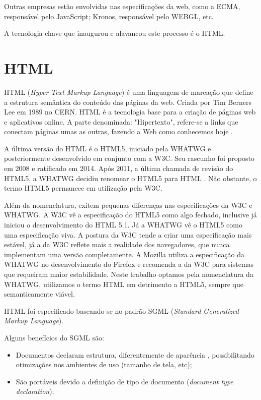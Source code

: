 Outras empresas estão envolvidas nas especificações da web, como a
ECMA, responsável pelo JavaScript; Kronos, responsável pelo WEBGL,
etc.

A tecnologia chave que inaugurou e alavancou este processo é o HTML.
\section{HTML}

HTML (\textit{Hyper Text Markup Language}) é uma linguagem de
marcação que define a estrutura semântica do conteúdo das páginas
da web. Criada por Tim Berners Lee em 1989 no CERN. HTML é a tecnologia
base para a criação de páginas web e aplicativos online. A parte
denominada: "Hipertexto", refere-se a links que conectam páginas umas
as outras, fazendo a Web como conhecemos hoje
\autocite{mdn2015}.

A última versão do HTML é o HTML5, iniciado pela WHATWG
e posteriormente desenvolvido em conjunto com a W3C.
Seu rascunho foi proposto em 2008 e ratificado em 2014.
Após 2011, a última chamada de revisão do HTML5,
a WHATWG decidiu renomear o HTML5 para HTML
\autocite{htmlIsTheNewHtml5}. Não obstante, o termo HTML5
permanece em utilização pela W3C.

Além da nomenclatura, exitem pequenas diferenças nas especificações
da W3C e WHATWG. A W3C vê a especificação do HTML5 como algo fechado,
inclusive já iniciou o desenvolvimento do HTML 5.1. Já a WHATWG vê o
HTML5 como uma especificação viva. A postura da W3C tende a criar uma
especificação mais estável, já a da W3C reflete mais a realidade dos
navegadores, que nunca implementam uma versão completamente. A Mozilla
utiliza a especificação da WHATWG no desenvolvimento do Firefox e
recomenda a da W3C para sistemas que requeiram maior estabilidade. Neste
trabalho optamos pela nomenclatura da WHATWG, utilizamos o termo HTML em
detrimento a HTML5, sempre que semanticamente viável.

HTML foi especificado baseando-se no padrão SGML (\textit{Standard Generalized
Markup Language}).

Alguns benefícios do SGML são:
\begin{itemize}
    \item Documentos declaram estrutura, diferentemente de aparência
, possibilitando otimizações nos ambientes de uso (tamanho de tela,
etc);
    \item São portáveis devido a definição de tipo de documento
(\textit{document type declaration});
\end{itemize}

